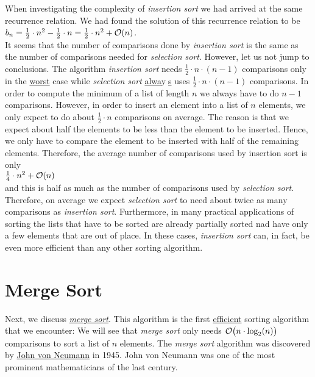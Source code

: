 When investigating the complexity of \emph{insertion sort} we had arrived at the same recurrence
relation. We had found the solution of this recurrence relation to be
\\[0.2cm]
\hspace*{1.3cm} $b_n = \frac{1}{2} \cdot n^2 - \frac{1}{2}\cdot n = \frac{1}{2} \cdot n^2 +
\mathcal{O}(n)$. 
\\[0.2cm]
It seems that the number of comparisons done by \emph{insertion sort} is the same as the number of
comparisons needed for \emph{selection sort}.  However, let us not jump to conclusions.
The algorithm \emph{insertion sort} needs
$\frac{1}{2}\cdot n \cdot (n-1)$ comparisons only in the \underline{worst} case while \emph{selection sort}
\underline{alwa}y$\!\!$\underline{$\;$s} uses $\frac{1}{2} \cdot n\cdot(n-1)$ comparisons.
In order to compute the minimum of a list of length $n$ we always have to do $n-1$ comparisons.
However, in order to insert an element into a list of $n$ elements, we only expect to do about
$\frac{1}{2} \cdot n$ comparisons on average.  The reason is that we expect about half the elements  to
be less than the element to be inserted.  Hence, we only have to compare the element to be inserted
with half of the remaining elements.  Therefore, the average number of comparisons used by
insertion sort is only
\\[0.2cm]
\hspace*{1.3cm}
 $\frac{1}{4} \cdot n^2 + \mathcal{O}(n)$
\\[0.2cm]
and this is half as much as the number of comparisons used by \emph{selection sort}.  Therefore, on
average we expect \emph{selection sort} to need about twice as many comparisons as \emph{insertion sort}.
Furthermore,  in many practical applications of sorting the lists that have to be sorted are already
partially sorted nad have only a few elements that are out of place.  In these cases,
\emph{insertion sort} can, in fact, be even more efficient than any other sorting algorithm.


\section{Merge Sort}
Next, we discuss \href{http://en.wikipedia.org/wiki/Merge_sort}{\emph{merge sort}}.  This algorithm
is the first \underline{efficient} sorting algorithm that we encounter: We will see that \emph{merge sort} 
only needs $\mathcal{O}\bigl(n \cdot \log_2(n)\bigr)$ comparisons to sort a list of $n$ elements.  
The \emph{merge sort} algorithm was discovered by
\href{http://en.wikipedia.org/wiki/John_von_Neumann}{John von Neumann} in 1945.  John von Neumann 
was one of the most prominent mathematicians of the last century.  

